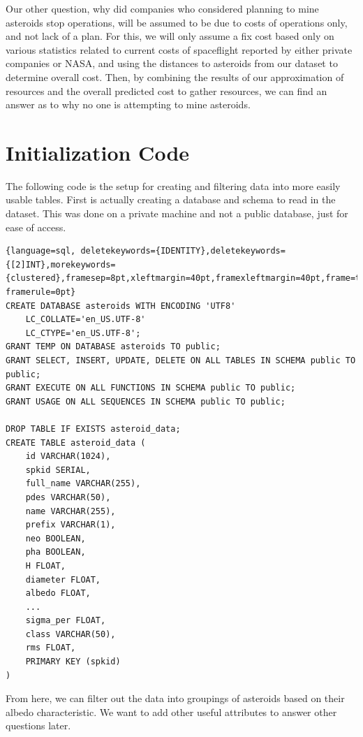 \documentclass[12pt]{report}
\begin{document}
\;\;\;\; Our other question, why did companies who considered planning to mine asteroids stop operations, will be assumed to be due to costs of operations only, and not lack of a plan. For this, we will only assume a fix cost based only on various statistics related to current costs of spaceflight reported by either private companies or NASA, and using the distances to asteroids from our dataset to determine overall cost. Then, by combining the results of our approximation of resources and the overall predicted cost to gather resources, we can find an answer as to why no one is attempting to mine asteroids.


\thispagestyle{empty}
\section*{Initialization Code}
The following code is the setup for creating and filtering data into more easily usable tables. First is actually creating a database and schema to read in the dataset. This was done on a private machine and not a public database, just for ease of access.

\hspace{-1.6cm}
\begin{lstlisting}{language=sql, deletekeywords={IDENTITY},deletekeywords={[2]INT},morekeywords={clustered},framesep=8pt,xleftmargin=40pt,framexleftmargin=40pt,frame=tb,	framerule=0pt}
CREATE DATABASE asteroids WITH ENCODING 'UTF8' 
	LC_COLLATE='en_US.UTF-8' 		
	LC_CTYPE='en_US.UTF-8';
GRANT TEMP ON DATABASE asteroids TO public;
GRANT SELECT, INSERT, UPDATE, DELETE ON ALL TABLES IN SCHEMA public TO public;
GRANT EXECUTE ON ALL FUNCTIONS IN SCHEMA public TO public;
GRANT USAGE ON ALL SEQUENCES IN SCHEMA public TO public;

DROP TABLE IF EXISTS asteroid_data;
CREATE TABLE asteroid_data (
	id VARCHAR(1024),
	spkid SERIAL,
	full_name VARCHAR(255),
	pdes VARCHAR(50),
	name VARCHAR(255),
	prefix VARCHAR(1),
	neo BOOLEAN,
	pha BOOLEAN,
	H FLOAT,
	diameter FLOAT,
	albedo FLOAT,
	...
	sigma_per FLOAT,
	class VARCHAR(50),
	rms FLOAT,
	PRIMARY KEY (spkid)
)\end{lstlisting}


From here, we can filter out the data into groupings of asteroids based on their albedo characteristic. We want to add other useful attributes to answer other questions later. 
\end{document}
